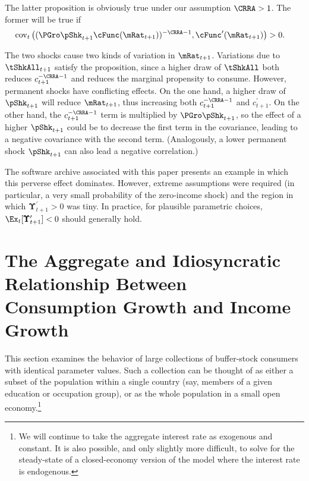 \documentclass[BufferStockTheory]{subfiles}
\begin{document}
The latter proposition is obviously true under our assumption $\CRRA > 1$.  The former will be true if
\begin{align*}
  \mbox{cov}_{t}\left((\PGro \pShk_{t+1} \cFunc(\mRat_{t+1}))^{-\CRRA-1},\cFunc^{\prime}(\mRat_{t+1}) \right)  & > 0 \nonumber.
\end{align*}

The two shocks cause two kinds of variation in $\mRat_{t+1}$.
Variations due to $\tShkAll_{t+1}$ satisfy the proposition, since a
higher draw of $\tShkAll$ both reduces $c_{t+1}^{-\CRRA-1}$ and
reduces the marginal propensity to consume.  However, permanent shocks
have conflicting effects.  On the one hand, a higher draw of
$\pShk_{t+1}$ will reduce $\mRat_{t+1}$, thus increasing both
$c_{t+1}^{-\CRRA-1}$ and $c_{t+1}^{\prime}$.  On the other hand, the
$c_{t+1}^{-\CRRA-1}$ term is multiplied by $\PGro \pShk_{t+1}$, so the
effect of a higher $\pShk_{t+1}$ could be to decrease the first term
in the covariance, leading to a negative covariance with the second
term.  (Analogously, a lower permanent shock $\pShk_{t+1}$ can also
lead a negative correlation.)


The software archive associated with this paper presents an example in
which this perverse effect dominates.  However, extreme assumptions
were required (in particular, a very small probability of the
zero-income shock) and the region in which
$\pmb{\Upsilon}_{t+1}^{\prime} > 0$ was tiny.  In practice, for
plausible parametric choices,
$\Ex_{t}[\pmb{\Upsilon}_{t+1}^{\prime}]<0$ should generally hold.



\hypertarget{The-Aggregate-and-Idiosyncratic-Relationship-Between-Consumption-Growth-and-Income-Growth}{}
\section{The Aggregate and Idiosyncratic Relationship Between
  Consumption Growth and Income Growth}

This section examines the behavior of large collections of buffer-stock consumers with identical parameter values. Such a collection can be thought of as either a subset of the population within a single country (say, members of a given education or occupation group), or as the whole population in a small open economy.\footnote{We will continue to take the aggregate interest rate as exogenous and constant. It is also possible, and only slightly more difficult, to solve for the steady-state of a closed-economy version of the model where the interest rate is endogenous.}
\end{document}
